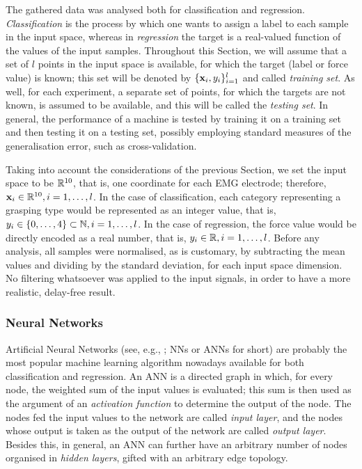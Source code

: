 The gathered data was analysed both for classification and
regression. \emph{Classification} is the process by which one wants to
assign a label to each sample in the input space, whereas in
\emph{regression} the target is a real-valued function of the values
of the input samples. Throughout this Section, we will assume that a
set of $l$ points in the input space is available, for which the
target (label or force value) is known; this set will be denoted by
$\{\mathbf{x}_i,y_i\}_{i=1}^l$ and called \emph{training set}. As well, for
each experiment, a separate set of points, for which the targets are
not known, is assumed to be available, and this will be called the
\emph{testing set}. In general, the performance of a machine is tested
by training it on a training set and then testing it on a testing set,
possibly employing standard measures of the generalisation error, such
as cross-validation.

Taking into account the considerations of the previous Section, we set
the input space to be $\mathbb{R}^{10}$, that is, one coordinate for each EMG
electrode; therefore, $\mathbf{x}_i \in \mathbb{R}^{10}, i=1,\ldots,l$. In the case
of classification, each category representing a grasping type would be
represented as an integer value, that is, $y_i \in \{0,\ldots,4\}
\subset \mathbb{N}, i=1,\ldots,l$. In the case of regression, the force value
would be directly encoded as a real number, that is, $y_i \in \mathbb{R},
i=1,\ldots,l$. Before any analysis, all samples were normalised, as is
customary, by subtracting the mean values and dividing by the standard
deviation, for each input space dimension. No filtering whatsoever was
applied to the input signals, in order to have a more realistic,
delay-free result.

\subsubsection{Neural Networks}

Artificial Neural Networks (see, e.g., \cite{...}; NNs or ANNs for
short) are probably the most popular machine learning algorithm
nowadays available for both classification and regression. An ANN is a
directed graph in which, for every node, the weighted sum of the input
values is evaluated; this sum is then used as the argument of an
\emph{activation function} to determine the output of the node. The
nodes fed the input values to the network are called \emph{input
layer}, and the nodes whose output is taken as the output of the
network are called \emph{output layer}. Besides this, in general, an
ANN can further have an arbitrary number of nodes organised in
\emph{hidden layers}, gifted with an arbitrary edge topology.

